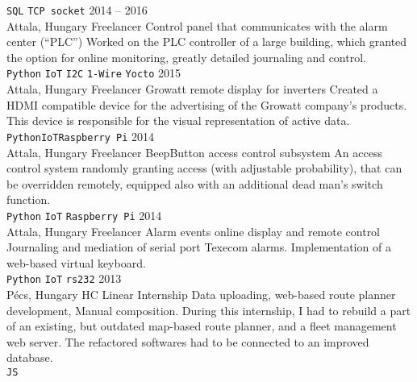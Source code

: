 \documentclass[9pt]{developercv} %
\begin{document}
\begin{entrylist}
{            \texttt{SQL}\slashsep
            \texttt{TCP socket}
        }
    \entry
        {2014 -- 2016 \\ Attala, Hungary}
        {Freelancer}
        {Control panel that communicates with the alarm center (“PLC”)}
        {Worked on the PLC controller of a large building, which granted the option for online monitoring, greatly detailed
            journaling and control. \\ 
            \texttt{Python}\slashsep
            \texttt{IoT}\slashsep
            \texttt{I2C}\slashsep
            \texttt{1-Wire}\slashsep
            \texttt{Yocto}
        }
    \entry
        {2015 \\ Attala, Hungary}
        {Freelancer}
        {Growatt remote display for inverters}
        {Created a HDMI compatible device for the advertising of the Growatt company’s products. This device is responsible
            for the visual representation of active data.
            \\ \texttt{Python}\slashsep\texttt{IoT}\slashsep\texttt{Raspberry Pi}}
    \entry
        {2014 \\ Attala, Hungary}
        {Freelancer}
        {BeepButton access control subsystem}
        {An access control system randomly granting access (with adjustable probability), that can be overridden remotely,
            equipped also with an additional dead man’s switch function.\\
            \texttt{Python}\slashsep
            \texttt{IoT}\slashsep
            \texttt{Raspberry Pi}
        }
    \entry
        {2014 \\ Attala, Hungary}
        {Freelancer}
        {Alarm events online display and remote control}
        {Journaling and mediation of serial port Texecom alarms. Implementation of a web-based virtual keyboard.\\
            \texttt{Python}\slashsep
            \texttt{IoT}\slashsep
            \texttt{rs232}
        }
    \entry
        {2013 \\ Pécs, Hungary}
        {HC Linear}
        {Internship}
        {Data uploading, web-based route planner development, Manual composition. During this internship, I had to rebuild a
            part of an existing, but outdated map-based route planner, and a fleet management web server. The refactored
            softwares had to be connected to an improved database.\\
            \texttt{JS}
        }
\end{entrylist}
\end{document}
